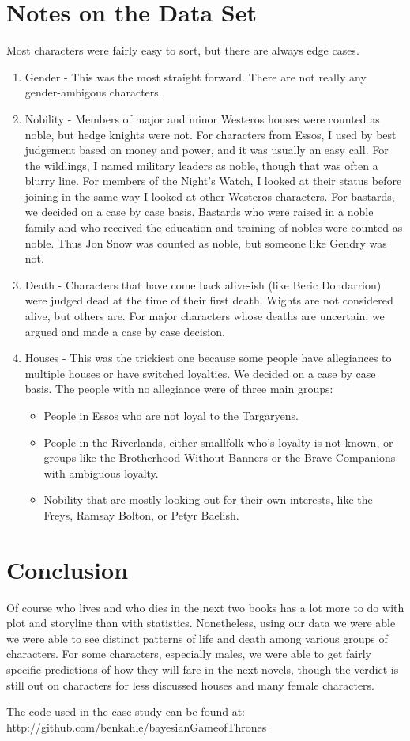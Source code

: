 \documentclass{article}
\begin{document}
\section{Notes on the Data Set}
Most characters were fairly easy to sort, but there are always edge cases.
\begin{enumerate}
\item Gender - This was the most straight forward.  There are not really any gender-ambigous characters.
\item Nobility - Members of major and minor Westeros houses were counted as noble, but hedge knights were not.  For characters from Essos, I used by best judgement based on money and power, and it was usually an easy call.  For the wildlings, I named military leaders as noble, though that was often a blurry line. For members of the Night's Watch, I looked at their status before joining in the same way I looked at other Westeros characters.  For bastards, we decided on a case by case basis.  Bastards who were raised in a noble family and who received the education and training of nobles were counted as noble.  Thus Jon Snow was counted as noble, but someone like Gendry was not.
\item Death - Characters that have come back alive-ish (like Beric Dondarrion) were judged dead at the time of their first death.  Wights are not considered alive, but others are. For major characters whose deaths are uncertain, we argued and made a case by case decision.
\item Houses - This was the trickiest one because some people have allegiances to multiple houses or have switched loyalties. We decided on a case by case basis.  The people with no allegiance were of three main groups:
    \begin{itemize}
        \item People in Essos who are not loyal to the Targaryens.
        \item People in the Riverlands, either smallfolk who's loyalty is not known, or groups like the Brotherhood Without Banners or the Brave Companions with ambiguous loyalty.
        \item Nobility that are mostly looking out for their own interests, like the Freys, Ramsay Bolton, or Petyr Baelish. 
    \end{itemize}
\end{enumerate}
\section{Conclusion}
Of course who lives and who dies in the next two books has a lot more to do with plot and storyline than with statistics.  Nonetheless, using our data we were able we were able to see distinct patterns of life and death among various groups of characters.  For some characters, especially males, we were able to get fairly specific predictions of how they will fare in the next novels, though the verdict is still out on characters for less discussed houses and many female characters.

The code used in the case study can be found at: \\
http://github.com/benkahle/bayesianGameofThrones
\end{document}
